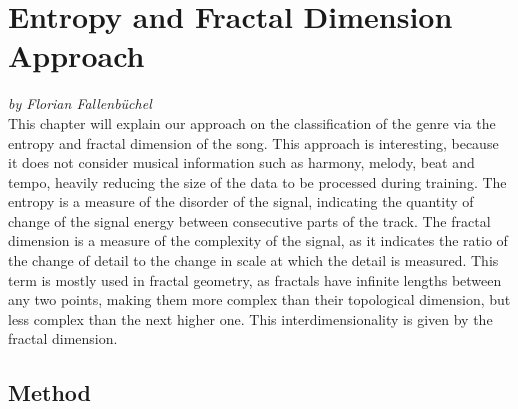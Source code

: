 \chapter{Entropy and Fractal Dimension Approach}

\textit{by Florian Fallenbüchel}\\

This chapter will explain our approach on the classification of the
genre via the entropy and fractal dimension of the song. This approach
is interesting, because it does not consider musical information such as
harmony, melody, beat and tempo, heavily reducing the size of the data
to be processed during training. The entropy is a measure of the
disorder of the signal, indicating the quantity of change of the signal
energy between consecutive parts of the track. The fractal dimension is
a measure of the complexity of the signal, as it indicates the ratio of
the change of detail to the change in scale at which the detail is
measured. This term is mostly used in fractal geometry, as fractals have
infinite lengths between any two points, making them more complex than
their topological dimension, but less complex than the next higher one.
This interdimensionality is given by the fractal dimension.\\

\section{Method}

